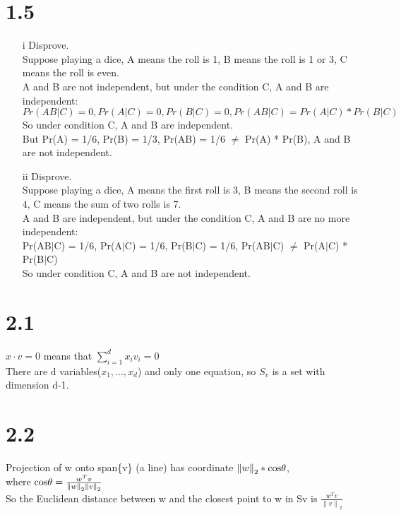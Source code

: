 \documentclass[12pt]{article}
\begin{document}
\section*{1.5}
\begin{enumerate}
\item[i]
Disprove.\\
Suppose playing a dice, A means the roll is 1, B means the roll is 1 or 3, C means the roll is even.\\
A and B are not independent, but under the condition C, A and B are independent:
$$Pr(AB|C) = 0, Pr(A|C) = 0, Pr(B|C) = 0, Pr(AB|C) = Pr(A|C) * Pr(B|C)$$
So under condition C, A and B are independent.\\
But Pr(A) = 1/6, Pr(B) = 1/3, Pr(AB) = 1/6 $\neq$ Pr(A) * Pr(B), A and B are not independent.

	
\item[ii]
Disprove.\\
Suppose playing a dice, A means the first roll is 3, B means the second roll is 4, C means the sum of two rolls is 7.\\
A and B are independent, but under the condition C, A and B are no more independent:\\
Pr(AB$|$C) = 1/6, Pr(A$|$C) = 1/6, Pr(B$|$C) = 1/6, Pr(AB$|$C) $\neq$ Pr(A$|$C) * Pr(B$|$C)\\
So under condition C, A and B are not independent.
\end{enumerate}




\section*{2.1}
$x \cdot v = 0$ means that $\sum_{i=1}^{d}x_iv_i=0$\\
There are d variables($x_1,..., x_d$) and only one equation, so $S_v$ is a set with dimension d-1.




\section*{2.2}
Projection of w onto span\{v\} (a line) has coordinate $\left \| w \right \|_2 * \textup{cos}\theta $, \\
where $\textup{cos}\theta = \frac{w^Tv}{\left \| w \right \|_2\left \| v \right \|_2}$\\
So the Euclidean distance between w and the closest point to w in Sv is $\frac{w^Tv}{\left \| v \right \|_2}$\\
\end{document}
